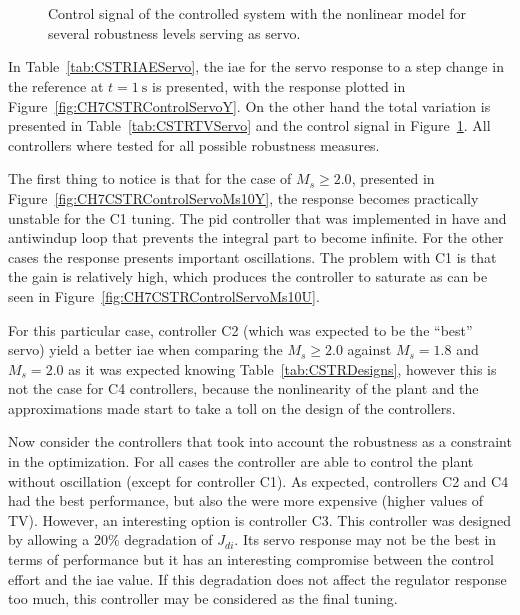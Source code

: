 %
%
\begin{figure}
	\centering
	\\
	\\
	\caption{Control signal of the controlled system with the nonlinear model for several robustness levels serving as servo.}
	\label{fig:CH7CSTRControlServoU}
\end{figure}
%
In Table~\ref{tab:CSTRIAEServo}, the \gls{iae} for the servo response to a step change in the reference at $t= \SI{1}{\second}$ is presented, with the response  plotted in Figure~\ref{fig:CH7CSTRControlServoY}. On the other hand the total variation is presented in Table~\ref{tab:CSTRTVServo} and the control signal in Figure~\ref{fig:CH7CSTRControlServoU}. All controllers where tested for all possible robustness measures.

The first thing to notice is that for the case of $M_s \geq 2.0$, presented in Figure~\ref{fig:CH7CSTRControlServoMs10Y}, the response becomes practically unstable for the C1 tuning. The \gls{pid} controller that was implemented in \simulink have and antiwindup loop that prevents the integral part to become infinite. For the other cases the response presents important oscillations. The problem with C1 is that the gain is relatively high, which produces the controller to saturate as can be seen in Figure~\ref{fig:CH7CSTRControlServoMs10U}.

For this particular case, controller C2 (which was expected to be the ``best'' servo) yield a better \gls{iae} when comparing the $M_s \geq 2.0$ against $M_s = 1.8$ and $M_s = 2.0$ as it was expected knowing Table~\ref{tab:CSTRDesigns}, however this is not the case for C4 controllers, because the nonlinearity of the plant and the approximations made start to take a toll on the design of the controllers.

Now consider the controllers that took into account the robustness as a constraint in the optimization. For all cases the controller are able to control the plant without oscillation (except for controller C1). As expected, controllers C2 and C4 had the best performance, but also the were more expensive (higher values of TV). However, an interesting option is controller C3. This controller was designed by allowing a 20\% degradation of $J_{di}$. Its servo response may not be the best in terms of performance but it has an interesting compromise between the control effort and the \gls{iae} value. If this degradation does not affect the regulator response too much, this controller may be considered as the final tuning.

